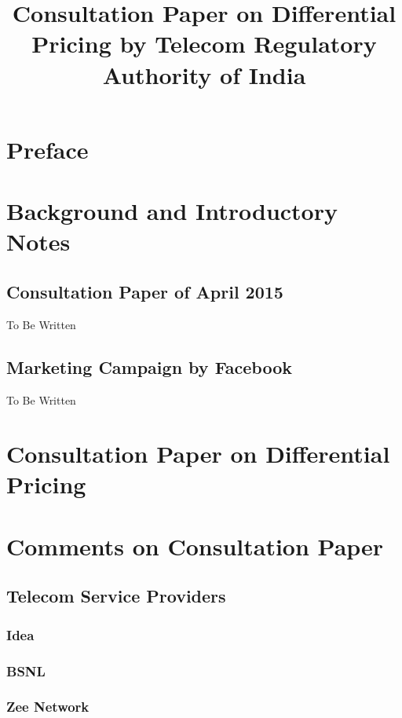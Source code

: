 \documentclass{article}
\title{Consultation Paper on Differential Pricing by Telecom Regulatory
Authority of India}
\begin{document}
\maketitle
\newpage

\tableofcontents
\newpage


\section{Preface}

\section{Background and Introductory Notes}
\newpage
\subsection{Consultation Paper of April 2015}
To Be Written
\newpage

\subsection{Marketing Campaign by Facebook}
To Be Written
\newpage

\section{Consultation Paper on Differential Pricing}


\newpage

\section{Comments on Consultation Paper}

\subsection{Telecom Service Providers}
\subsubsection{Idea}


\subsubsection{BSNL}


\subsubsection{Zee Network}

\end{document}
